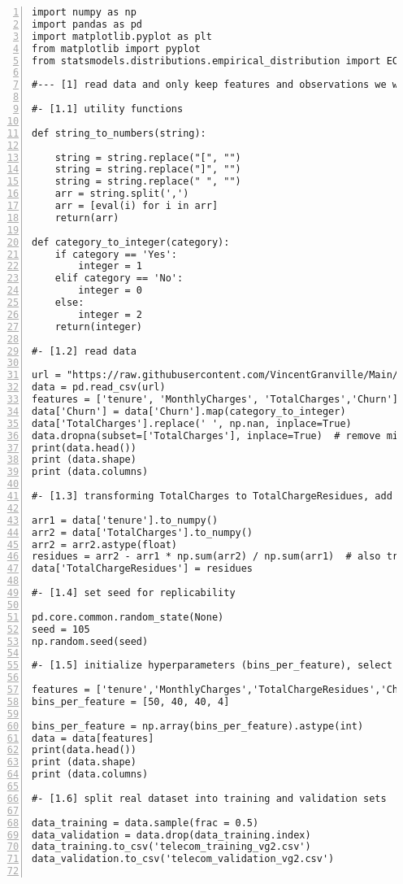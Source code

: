 \documentclass[oneside,10pt]{book}
\begin{document}
\begin{lstlisting}[numbers=left]
import numpy as np
import pandas as pd
import matplotlib.pyplot as plt
from matplotlib import pyplot
from statsmodels.distributions.empirical_distribution import ECDF

#--- [1] read data and only keep features and observations we want

#- [1.1] utility functions

def string_to_numbers(string):

    string = string.replace("[", "")
    string = string.replace("]", "")
    string = string.replace(" ", "")
    arr = string.split(',')
    arr = [eval(i) for i in arr]
    return(arr)

def category_to_integer(category):
    if category == 'Yes':
        integer = 1
    elif category == 'No':
        integer = 0
    else:
        integer = 2
    return(integer)

#- [1.2] read data

url = "https://raw.githubusercontent.com/VincentGranville/Main/main/Telecom.csv"
data = pd.read_csv(url)
features = ['tenure', 'MonthlyCharges', 'TotalCharges','Churn'] 
data['Churn'] = data['Churn'].map(category_to_integer) 
data['TotalCharges'].replace(' ', np.nan, inplace=True)
data.dropna(subset=['TotalCharges'], inplace=True)  # remove missing data
print(data.head()) 
print (data.shape)
print (data.columns)

#- [1.3] transforming TotalCharges to TotalChargeResidues, add to dataframe

arr1 = data['tenure'].to_numpy()
arr2 = data['TotalCharges'].to_numpy() 
arr2 = arr2.astype(float)
residues = arr2 - arr1 * np.sum(arr2) / np.sum(arr1)  # also try arr2/arr1
data['TotalChargeResidues'] = residues

#- [1.4] set seed for replicability

pd.core.common.random_state(None)
seed = 105
np.random.seed(seed)

#- [1.5] initialize hyperparameters (bins_per_feature), select features

features = ['tenure','MonthlyCharges','TotalChargeResidues','Churn'] 
bins_per_feature = [50, 40, 40, 4]   

bins_per_feature = np.array(bins_per_feature).astype(int)
data = data[features]
print(data.head())
print (data.shape)
print (data.columns)

#- [1.6] split real dataset into training and validation sets

data_training = data.sample(frac = 0.5)
data_validation = data.drop(data_training.index)
data_training.to_csv('telecom_training_vg2.csv')
data_validation.to_csv('telecom_validation_vg2.csv')


\end{lstlisting}
\end{document}
